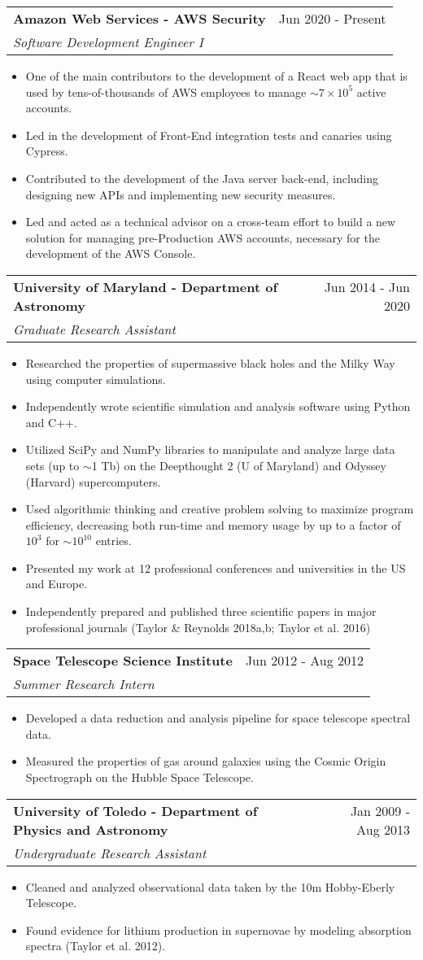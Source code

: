 \documentclass[letterpaper,11pt]{article}
\makeatletter
\newlength{\outerbordwidth}
\newcommand{\resitem}[1]{\item #1 \vspace{-4pt}}
\newcommand{\resheading}[1]{\vspace{1pt}
  \parbox{\textwidth}{\setlength{\FrameSep}{\outerbordwidth}
    \begin{shaded}
\setlength{\fboxsep}{0pt}\framebox[\textwidth][l]{\setlength{\fboxsep}{4pt}\fcolorbox{shadecolorB}{shadecolorB}{\textbf{\sffamily{\mbox{~}\makebox[7.25in][l]{\large #1} \vphantom{p\^{E}}}}}}
    \end{shaded}
  }\vspace{-5pt}
}
\newcommand{\ressubheading}[4]{
\begin{tabular*}{7.5in}{l@{\cftdotfill{\cftsecdotsep}\extracolsep{\fill}}r}
		\textbf{#1} & #2 \\
		\textit{#3} & \textit{#4} \\
\end{tabular*}\vspace{-6pt}}
\makeatother
\begin{document}
\resheading{Work Experience}
\ressubheading{Amazon Web Services - AWS Security}{Jun 2020 - Present}{Software Development Engineer I}{}
\begin{itemize}
	\resitem{One of the main contributors to the development of a React web app that is used by tens-of-thousands of AWS employees to manage $\sim 7 \times 10^{5}$ active accounts.}
	\resitem{Led in the development of Front-End integration tests and canaries using Cypress.}
	\resitem{Contributed to the development of the Java server back-end, including designing new APIs and implementing new security measures.}
	\resitem{Led and acted as a technical advisor on a cross-team effort to build a new solution for managing pre-Production AWS accounts, necessary for the development of the AWS Console.}
\end{itemize}
\ressubheading{University of Maryland - Department of Astronomy}{Jun 2014 - Jun 2020}{Graduate Research Assistant}{}
\begin{itemize}
	\resitem{Researched the properties of supermassive black holes and the Milky Way using computer simulations.}
	\resitem{Independently wrote scientific simulation and analysis software using Python and C++.}
	\resitem{Utilized SciPy and NumPy libraries to manipulate and analyze large data sets (up to $\sim$1 Tb) on the Deepthought 2 (U of Maryland) and Odyssey (Harvard) supercomputers.}
	\resitem{Used algorithmic thinking and creative problem solving to maximize program efficiency, decreasing both run-time and memory usage by up to a factor of  $10^{3}$ for $\sim10^{10}$ entries.}
	\resitem{Presented my work at 12 professional conferences and universities in the US and Europe.}
	\resitem{Independently prepared and published three scientific papers in major professional journals (Taylor \& Reynolds 2018a,b; Taylor et al. 2016)}
\end{itemize}
\ressubheading{Space Telescope Science Institute}{Jun 2012 - Aug 2012}{Summer Research Intern}{}
\begin{itemize}
	\resitem{Developed a data reduction and analysis pipeline for space telescope spectral data.}
	\resitem{Measured the properties of gas around galaxies using the Cosmic Origin Spectrograph on the Hubble Space Telescope.}
\end{itemize}
\ressubheading{University of Toledo - Department of Physics and Astronomy}{Jan 2009 - Aug 2013}{Undergraduate Research Assistant}{}
\begin{itemize}
	\resitem{Cleaned and analyzed observational data taken by the 10m Hobby-Eberly Telescope.}
	\resitem{Found evidence for lithium production in supernovae by modeling absorption spectra (Taylor et al. 2012).}
\end{itemize}
\end{document}
